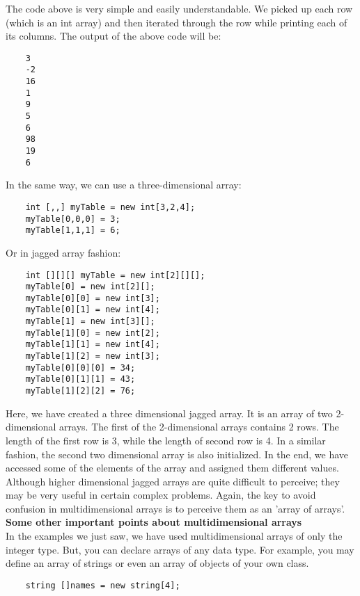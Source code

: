 The code above is very simple and easily understandable. We picked up each row (which is an int array) and then
iterated through the row while printing each of its columns. The output of the above code will be:


\begin{lstlisting}
    3
    -2
    16
    1
    9
    5
    6
    98
    19
    6        
\end{lstlisting}

In the same way, we can use a three-dimensional array:

\begin{lstlisting}
    int [,,] myTable = new int[3,2,4];
    myTable[0,0,0] = 3;
    myTable[1,1,1] = 6;        
\end{lstlisting}

Or in jagged array fashion:

\begin{lstlisting}
    int [][][] myTable = new int[2][][];
    myTable[0] = new int[2][];
    myTable[0][0] = new int[3];
    myTable[0][1] = new int[4];
    myTable[1] = new int[3][];
    myTable[1][0] = new int[2];
    myTable[1][1] = new int[4];
    myTable[1][2] = new int[3];
    myTable[0][0][0] = 34;
    myTable[0][1][1] = 43;
    myTable[1][2][2] = 76;        
\end{lstlisting}

Here, we have created a three dimensional jagged array. It is an array of two 2-dimensional arrays. The first of the
2-dimensional arrays contains 2 rows. The length of the first row is 3, while the length of second row is 4. In a
similar fashion, the second two dimensional array is also initialized. In the end, we have accessed some of the
elements of the array and assigned them different values. Although higher dimensional jagged arrays are quite
difficult to perceive; they may be very useful in certain complex problems. Again, the key to avoid confusion in
multidimensional arrays is to perceive them as an ’array of arrays’.\\

\textbf{Some other important points about multidimensional arrays}\\

In the examples we just saw, we have used multidimensional arrays of only the integer type. But, you can declare
arrays of any data type. For example, you may define an array of strings or even an array of objects of your own
class.

\begin{lstlisting}
    string []names = new string[4];    
\end{lstlisting}

